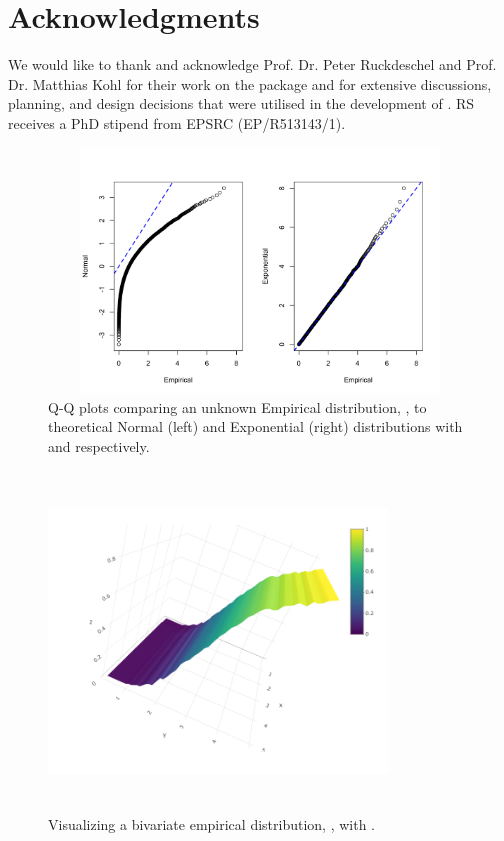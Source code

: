 
\section*{Acknowledgments}

We would like to thank and acknowledge Prof. Dr. Peter Ruckdeschel and Prof. Dr. Matthias Kohl for their work on the  package and for extensive discussions, planning, and design decisions that were utilised in the development of . RS receives a PhD stipend from EPSRC (EP/R513143/1).

\begin{figure}[h]
\centering
\includegraphics[width = 13cm, height = 6.5cm]{images/Fig_3}
\caption{Q-Q plots comparing an unknown Empirical distribution, , to theoretical Normal (left) and Exponential (right) distributions with  and  respectively.}
\label{fig:qqplot}
\end{figure}

\begin{figure}[h]
\centering
\includegraphics[width = 9cm, height = 9cm]{images/Fig_4}
\caption{Visualizing a bivariate empirical distribution, , with .}
\label{fig:empmv}
\end{figure}

